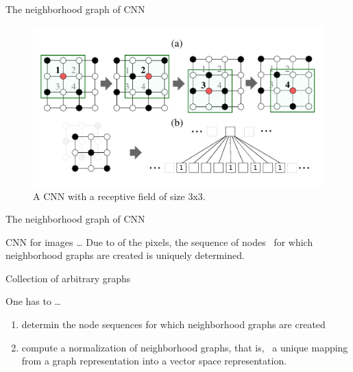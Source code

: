 \documentclass[dvipdfmx]{beamer}
\begin{document}
  \begin{frame}{The neighborhood graph of CNN}
    \begin{figure}[h]
      \centering
      \includegraphics[width=0.8\paperwidth]{img/Fig1.pdf}
      \caption{A CNN with a receptive field of size 3x3.}
    \end{figure}
  \end{frame}

  \begin{frame}{The neighborhood graph of CNN}
    \begin{block}{CNN for images \dots}
      Due to  of the pixels, the sequence of nodes \
      for which neighborhood graphs are created is \alert{uniquely determined.}
    \end{block}
  \end{frame}

  \begin{frame}{Collection of \alert{arbitrary} graphs}
    \begin{block}{One has to \dots}
      \begin{enumerate}
        \item determin the node sequences for which neighborhood graphs are created
        \item compute a \alert{normalization} of neighborhood graphs, that is, \
          a unique mapping from a graph representation into a vector space representation.
      \end{enumerate}
    \end{block}

    \vspace{1cm}
  \end{frame}
\end{document}
